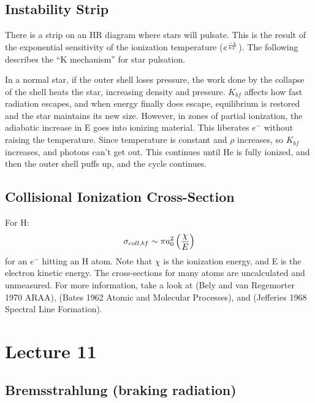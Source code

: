 \documentclass[11pt]{article}
\begin{document}
\subsection*{ Instability Strip}

There is a strip on an HR diagram where stars will pulsate.  This is the
result of the exponential sensitivity of the ionization temperature
($e^{-\chi\over kT}$).  The following describes the ``K mechanism'' for
star pulsation.\par
In a normal star, if the outer shell loses pressure, the work done by
the collapse of the shell heats the star, increasing density and pressure.
$K_{bf}$ affects how fast radiation escapes, and when energy finally
does  escape, equilibrium is restored and the star maintains its new
size.  However, in zones of partial ionization, the adiabatic increase
in E goes into ionizing material.  This liberates $e^-$ without raising
the temperature.  Since temperature is constant and $\rho$ increases,
so $K_{bf}$ increases, and photons can't get out.  This continues until
He is fully ionized, and then the outer shell puffs up, and the cycle
continues.

\subsection*{ Collisional Ionization Cross-Section}

For H:
$$\sigma_{coll,bf}\sim\pi a_0^2\left({\chi\over E}\right)$$
for an $e^-$ hitting an H atom.  Note that $\chi$ is the ionization
energy, and E is the electron kinetic energy.  The cross-sections
for many atoms are uncalculated and unmeasured.  For more information,
take a look at (Bely and van Regemorter 1970 ARAA), (Bates 1962 Atomic
and Molecular Processes), and (Jefferies 1968 Spectral Line Formation).

\section*{ Lecture 11 }

\subsection*{ Bremsstrahlung (braking radiation)}
\end{document}
